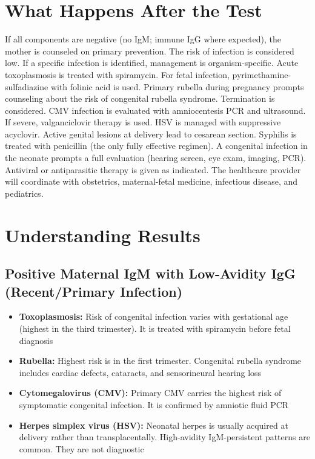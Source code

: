\section*{What Happens After the Test}
If all components are negative (no IgM; immune IgG where expected), the mother is counseled on primary prevention. The risk of infection is considered low. If a specific infection is identified, management is organism-specific. Acute toxoplasmosis is treated with spiramycin. For fetal infection, pyrimethamine-sulfadiazine with folinic acid is used. Primary rubella during pregnancy prompts counseling about the risk of congenital rubella syndrome. Termination is considered. CMV infection is evaluated with amniocentesis PCR and ultrasound. If severe, valganciclovir therapy is used. HSV is managed with suppressive acyclovir. Active genital lesions at delivery lead to cesarean section. Syphilis is treated with penicillin (the only fully effective regimen). A congenital infection in the neonate prompts a full evaluation (hearing screen, eye exam, imaging, PCR). Antiviral or antiparasitic therapy is given as indicated. The healthcare provider will coordinate with obstetrics, maternal-fetal medicine, infectious disease, and pediatrics.

\section*{Understanding Results}

\subsection*{Positive Maternal IgM with Low-Avidity IgG (Recent/Primary Infection)}
\begin{itemize}
  \item \textbf{Toxoplasmosis:} Risk of congenital infection varies with gestational age (highest in the third trimester). It is treated with spiramycin before fetal diagnosis
  \item \textbf{Rubella:} Highest risk is in the first trimester. Congenital rubella syndrome includes cardiac defects, cataracts, and sensorineural hearing loss
  \item \textbf{Cytomegalovirus (CMV):} Primary CMV carries the highest risk of symptomatic congenital infection. It is confirmed by amniotic fluid PCR
  \item \textbf{Herpes simplex virus (HSV):} Neonatal herpes is usually acquired at delivery rather than transplacentally. High-avidity IgM-persistent patterns are common. They are not diagnostic
\end{itemize}

